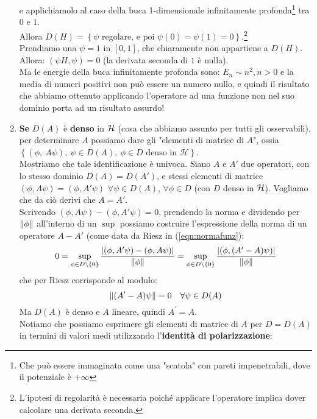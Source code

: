 \documentclass[FisicaTeorica.tex]{subfiles}
\begin{document}
\begin{enumerate}
\begin{es}
	e applichiamolo al caso della buca 1-dimensionale infinitamente profonda\footnote{Che può essere immaginata come una "scatola" con pareti impenetrabili, dove il potenziale è $+\infty$} tra $0$ e $1$.\\
	Allora $D\left(H\right)=\left\{\psi\text{\ regolare,\ e\ poi\ } \psi\left(0\right)=\psi\left(1\right)=0\right\}$.\footnote{L'ipotesi di regolarità è necessaria poiché applicare l'operatore implica dover calcolare una derivata seconda.}\\
	Prendiamo una $\psi=1$ in $[0,1]$, che chiaramente non appartiene a $D(H)$. 
	Allora:
	$\left(\psi H,\psi\right)=0$ (la derivata seconda di $1$ è nulla).\\ 
	Ma le energie della buca infinitamente profonda sono: $E_n\sim n^2, n>0$ e la media di numeri positivi non può essere un numero nullo, e quindi il risultato che abbiamo ottenuto applicando l'operatore ad una funzione non nel suo dominio porta ad un risultato assurdo!
	\end{es}
\item \textbf{Se} $D(A)$ è \textbf{denso} in $\mathcal{H}$ (cosa che abbiamo assunto per tutti gli osservabili), per determinare $A$ possiamo dare gli "elementi di matrice di $A$", ossia $\left\{\left(\phi,\ A\psi\right),\ \psi\in D\left(A\right),\ \phi\in D\text{\ denso\ in\ }\mathcal{H}\right\}$.\\
Mostriamo che tale identificazione è univoca. Siano $A$ e $A'$ due operatori, con lo stesso dominio $D(A) = D(A')$, e stessi elementi di matrice $(\phi, A\psi) = (\phi, A'\psi)$ $\forall \psi \in D(A)$, $\forall \phi \in D$ (con $D$ denso in $\mathcal{H}$). Vogliamo che da ciò derivi che $A = A'$.\\
Scrivendo $(\phi, A\psi)-(\phi, A'\psi) = 0$, prendendo la norma e dividendo per $\left\lVert\phi\right\rVert$ all'interno di un $\sup$ possiamo costruire l'espressione della norma di un operatore $A-A'$ (come data da Riesz in (\ref{eqn:normafunz}): 
\[ 0 = \sup_{\phi \in D\setminus \{0\}}\frac{|(\phi, A'\psi)-(\phi, A\psi)|}{\left\lVert\phi\right\rVert} = \sup_{\phi\in D\setminus\{0\}} \frac{|(\phi, (A'-A)\psi)|}{\left\lVert\phi\right\rVert}
\]
che per Riesz corrisponde al modulo: %
\[
\left\lVert(A'-A)\psi\right\rVert = 0 \quad \forall \psi \in D(A)
\] 
	Ma $D(A)$ è denso e $A$ lineare, quindi $A^\prime=A$.\\
	Notiamo che possiamo esprimere gli elementi di matrice di $A$ per $D=D(A)$ in termini di valori medi utilizzando l'\textbf{identità di polarizzazione}:

\end{enumerate}
\end{document}
